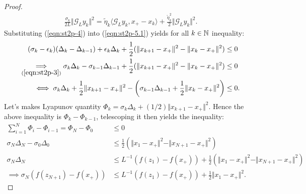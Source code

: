 \documentclass[12pt]{article}
\begin{document}
\begin{proof}
\begin{align*}
            \frac{\sigma_k}{2L}\Vert \mathcal G_L y_k\Vert^2
            = 
            \tilde \eta_k
            \langle  \mathcal G_Ly_k, x_+ - x_k\rangle
            + 
            \frac{\tilde \eta_k^2}{2}\Vert \mathcal G_L y_k\Vert^2. 
        \end{align*}
        Substituting (\ref*{eqn:st2p-4}) into (\ref*{eqn:st2p-5.1}) yields for all $k \in \mathbb N$ inequality: 
        \begin{align*}
            (\sigma_k - \epsilon_k)(\Delta_k - \Delta_{k - 1}) + \epsilon_k \Delta_k 
            + 
            \frac{1}{2}
            (
                \Vert x_{k + 1} - x_+\Vert^2 - \Vert x_k - x_+\Vert^2
            )
            &\le 0
            \\
            \underset{(\ref*{eqn:st2p-3})}{\implies}
            \sigma_k \Delta_k - \sigma_{k - 1}\Delta_{k - 1}
            + 
            \frac{1}{2}
            (
                \Vert x_{k + 1} - x_+\Vert^2 - \Vert x_k - x_+\Vert^2
            )
            &\le 
            0
            \\
            \iff 
            \sigma_k \Delta_k + \frac{1}{2}\Vert x_{k + 1} - x_+\Vert^2
            - 
            \left(
                \sigma_{k - 1}\Delta_{k - 1}
                + 
                \frac{1}{2}\Vert x_k - x_+\Vert^2
            \right)
            &\le 
            0.
        \end{align*}
        Let's makes Lyapunov quantity $\Phi_k = \sigma_k \Delta_k + (1/2)\Vert x_{k + 1} - x_+\Vert^2$. 
        Hence the above inequality is $\Phi_k - \Phi_{k - 1}$, telescoping it then yields the inequality: 
        \begin{align*}
            \sum_{i = 1}^{N}\Phi_i - \Phi_{i - 1} = \Phi_N - \Phi_0 
            &\le 0
            \\
            \sigma_N \Delta_N - \sigma_0 \Delta_0 &\le 
            \frac{1}{2}
            \left(
                \Vert x_1 - x_+\Vert^2 - \Vert x_{N + 1} - x_+\Vert^2
            \right)
            \\
            \sigma_N \Delta_N 
            &\le 
            L^{-1}(f(z_1) - f(x_+))
            +
            \frac{1}{2}\left(
                \Vert x_1 - x_+\Vert^2 - \Vert x_{N +1} - x_+\Vert^2
            \right)
            \\
            \implies 
            \sigma_N (f(z_{N + 1}) - f(x_+)) &\le 
            L^{-1}(f(z_1) - f(x_+)) + 
            \frac{1}{2}\Vert x_1 - x_+\Vert^2.
        \end{align*}

\end{proof}
\end{document}
